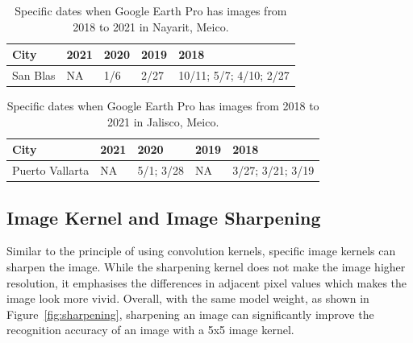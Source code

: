 \begin{table}[p]
\centering
\begin{tabular}{ l | p{2.5cm} | p{2.5cm} | p{2.5cm} | p{2.5cm} }
\toprule
City & 2021 & 2020 & 2019 & 2018 \\
\midrule
San Blas & NA & 1/6 & 2/27 & 10/11; 5/7; 4/10; 2/27\\
\bottomrule
\end{tabular}
\caption{Specific dates when Google Earth Pro has images from 2018 to 2021 in Nayarit, Meico.}
\label{table:Nayarit_dates}
\end{table}


\begin{table}[p]
\centering
\begin{tabular}{ l | p{2.5cm} | p{2.5cm} | p{2.5cm} | p{2.5cm} }
\toprule
City & 2021 & 2020 & 2019 & 2018 \\
\midrule
Puerto Vallarta & NA & 5/1; 3/28 & NA & 3/27; 3/21; 3/19\\
\bottomrule
\end{tabular}
\caption{Specific dates when Google Earth Pro has images from 2018 to 2021 in Jalisco, Meico.}
\label{table:Jalisco_dates}
\end{table}



\subsection{Image Kernel and Image Sharpening}
\label{sec3.2.2}
Similar to the principle of using convolution kernels, specific image kernels can sharpen the image. While the sharpening kernel does not make the image higher resolution, it emphasises the differences in adjacent pixel values which makes the image look more vivid. Overall, with the same model weight, as shown in Figure~\ref{fig:sharpening}, sharpening an image can significantly improve the recognition accuracy of an image with a 5x5 image kernel.\\

